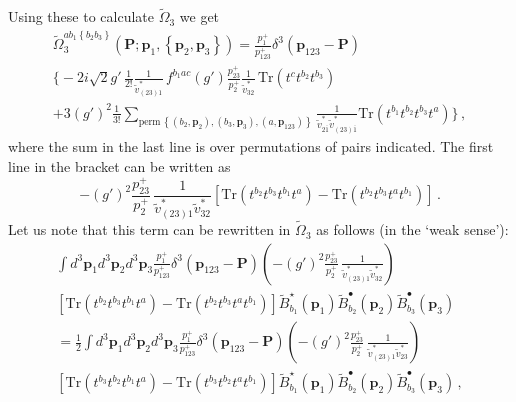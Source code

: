 \documentclass[english,american]{article}
\begin{document}
Using these to calculate $\tilde{\Omega}_{3}$ we get
\begin{multline}
\tilde{\Omega}_{3}^{ab_{1}\left\{ b_{2}b_{3}\right\} }\left(\mathbf{P};\mathbf{p}_{1},\left\{ \mathbf{p}_{2},\mathbf{p}_{3}\right\} \right)=\frac{p_{1}^{+}}{p_{123}^{+}}\delta^{3}\left(\mathbf{p}_{123}-\mathbf{P}\right)\\
\Bigg\{-2i\sqrt{2}g'\,\frac{1}{2!}\frac{1}{\tilde{v}_{\left(23\right)1}^{*}}\, f^{b_{1}ac}\left(g'\right)\frac{p_{23}^{+}}{p_{2}^{+}}\frac{1}{\tilde{v}_{32}^{*}}\,\mathrm{Tr}\left(t^{c}t^{b_{2}}t^{b_{3}}\right)\\
+3\left(g'\right)^{2}\frac{1}{3!}\sum_{\mathrm{perm\,}\left\{ \left(b_{2},\mathbf{p}_{2}\right),\left(b_{3},\mathbf{p}_{3}\right),\left(a,\mathbf{p}_{123}\right)\right\} }\frac{1}{\tilde{v}_{2\overline{1}}^{*}\tilde{v}_{\left(23\right)\overline{1}}^{*}}\mathrm{Tr}\left(t^{b_{1}}t^{b_{2}}t^{b_{3}}t^{a}\right)\Bigg\}\,,
\end{multline}
where the sum in the last line is over permutations of pairs indicated.
The first line in the bracket can be written as
\begin{equation}
-\left(g'\right)^{2}\frac{p_{23}^{+}}{p_{2}^{+}}\,\frac{1}{\tilde{v}_{\left(23\right)1}^{*}\tilde{v}_{32}^{*}}\left[\mathrm{Tr}\left(t^{b_{2}}t^{b_{3}}t^{b_{1}}t^{a}\right)-\mathrm{Tr}\left(t^{b_{2}}t^{b_{3}}t^{a}t^{b_{1}}\right)\right]\,.
\end{equation}
Let us note that this term can be rewritten in $\tilde{\Omega}_{3}$
as follows (in the `weak sense'):
\begin{multline}
\int d^{3}\mathbf{p}_{1}d^{3}\mathbf{p}_{2}d^{3}\mathbf{p}_{3}\frac{p_{1}^{+}}{p_{123}^{+}}\delta^{3}\left(\mathbf{p}_{123}-\mathbf{P}\right)\left(-\left(g'\right)^{2}\frac{p_{23}^{+}}{p_{2}^{+}}\,\frac{1}{\tilde{v}_{\left(23\right)1}^{*}\tilde{v}_{32}^{*}}\right)\\
\left[\mathrm{Tr}\left(t^{b_{2}}t^{b_{3}}t^{b_{1}}t^{a}\right)-\mathrm{Tr}\left(t^{b_{2}}t^{b_{3}}t^{a}t^{b_{1}}\right)\right]\tilde{B}_{b_{1}}^{\star}\left(\mathbf{p}_{1}\right)\tilde{B}_{b_{2}}^{\bullet}\left(\mathbf{p}_{2}\right)\tilde{B}_{b_{3}}^{\bullet}\left(\mathbf{p}_{3}\right)\\
=\frac{1}{2}\int d^{3}\mathbf{p}_{1}d^{3}\mathbf{p}_{2}d^{3}\mathbf{p}_{3}\frac{p_{1}^{+}}{p_{123}^{+}}\delta^{3}\left(\mathbf{p}_{123}-\mathbf{P}\right)\left(-\left(g'\right)^{2}\frac{p_{23}^{+}}{p_{2}^{+}}\,\frac{1}{\tilde{v}_{\left(23\right)1}^{*}\tilde{v}_{23}^{*}}\right)\\
\left[\mathrm{Tr}\left(t^{b_{3}}t^{b_{2}}t^{b_{1}}t^{a}\right)-\mathrm{Tr}\left(t^{b_{3}}t^{b_{2}}t^{a}t^{b_{1}}\right)\right]\tilde{B}_{b_{1}}^{\star}\left(\mathbf{p}_{1}\right)\tilde{B}_{b_{2}}^{\bullet}\left(\mathbf{p}_{2}\right)\tilde{B}_{b_{3}}^{\bullet}\left(\mathbf{p}_{3}\right)\,,
\end{multline}
\end{document}
